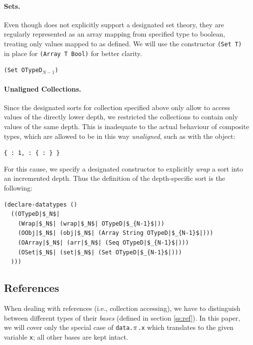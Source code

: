 \paragraph{Sets.}
Even though \ziii does not explicitly support a designated set theory, they are regularly represented as an array mapping from specified type to boolean, treating only values mapped to \true as defined.
We will use the constructor \texttt{(Set T)} in place for \texttt{(Array T Bool)} for better clarity.
\begin{center}
  \texttt{(Set OTypeD$_{N-1}$)}
\end{center}

\paragraph{Unaligned Collections.}
Since the designated sorts for collection specified above only allow to access values of the directly lower depth, we restricted the collections to contain only values of the same depth.
This is inadequate to the actual behaviour of composite types, which are allowed to be in this way \emph{unaligned}, such as with the object:
\begin{center}
  \texttt{\{ : 1, : \{ :  \} \}}
\end{center}
For this cause, we specify a designated constructor to explicitly \emph{wrap} a sort into an incremented depth.
Thus the definition of the depth-specific sort is the following:
\begin{lstlisting}[language=SMT,escapechar=|]
(declare-datatypes ()
  ((OTypeD|$_N$|
    (Wrap|$_N$| (wrap|$_N$| OTypeD|$_{N-1}$|))
    (OObj|$_N$| (obj|$_N$| (Array String OTypeD|$_{N-1}$|)))
    (OArray|$_N$| (arr|$_N$| (Seq OTypeD|$_{N-1}$|)))
    (OSet|$_N$| (set|$_N$| (Set OTypeD|$_{N-1}$|)))
  )))
\end{lstlisting}


\subsection{References}

When dealing with references (i.e., collection accessing), we have to distinguish between different types of their \emph{bases} (defined in section \ref{ss:ref}).
In this paper, we will cover only the special case of \texttt{data.$\pi$.x} which translates to the given variable \texttt{x}; all other bases are kept intact.

